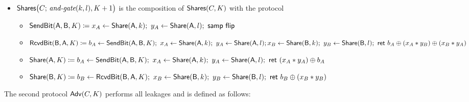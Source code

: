 \begin{itemize}
\item $\mathsf{Shares}\big(C; \, \textit{and-gate}(k,l),K+1\big)$ is the composition of $\mathsf{Shares}(C,K)$ with the protocol
\begin{itemize}
\item $\SendBit(\A,\B,K) \coloneqq x_A \leftarrow \Share(\A,k); \ y_A \leftarrow \Share(\A,l); \ \samp{\flip}$
\item $\mathsf{RcvdBit}(\mathsf{B},\mathsf{A},K) \coloneqq b_A \leftarrow \mathsf{SendBit}(\mathsf{A},\mathsf{B},K); \ x_A \leftarrow \mathsf{Share}(\mathsf{A},k); \ y_A \leftarrow \mathsf{Share}(\mathsf{A},l); \\ x_B \leftarrow \mathsf{Share}(\mathsf{B},k); \ y_B \leftarrow \mathsf{Share}(\mathsf{B},l); \ \mathsf{ret} \ b_A \oplus (x_A * y_B) \oplus (x_B * y_A)$
\item $\mathsf{Share}(\mathsf{A},K) \coloneqq b_A \leftarrow \mathsf{SendBit}(\mathsf{A},\mathsf{B},K); \ x_A \leftarrow \mathsf{Share}(\mathsf{A},k); \ y_A \leftarrow \mathsf{Share}(\mathsf{A},l); \ \mathsf{ret} \ (x_A * y_A) \oplus b_A$
\item $\mathsf{Share}(\mathsf{B},K) \coloneqq b_B \leftarrow \mathsf{RcvdBit}(\mathsf{B},\mathsf{A},K); \ x_B \leftarrow \mathsf{Share}(\mathsf{B},k); \ y_B \leftarrow \mathsf{Share}(\mathsf{B},l); \ \mathsf{ret} \ b_B \oplus (x_B * y_B)$
\end{itemize}
\end{itemize}

\noindent The second protocol $\mathsf{Adv}(C,K)$ performs all leakages and is defined as follows:

